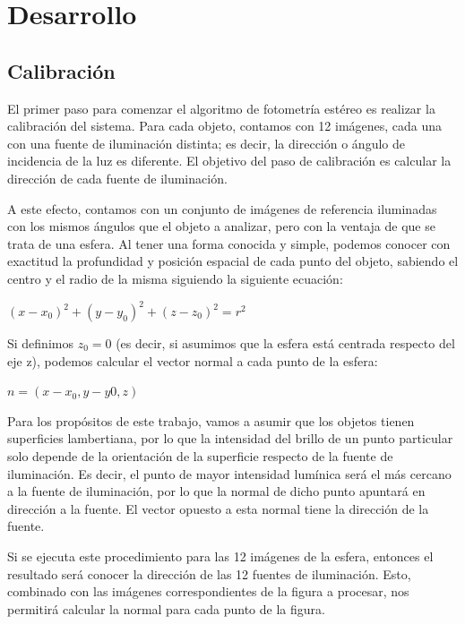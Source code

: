 \section{Desarrollo}

\subsection{Calibración}

El primer paso para comenzar el algoritmo de fotometría estéreo es realizar
la calibración del sistema. Para cada objeto, contamos con 12 imágenes,
cada una con una fuente de iluminación distinta; es decir, la dirección o
ángulo de incidencia de la luz es diferente. El objetivo del paso de calibración
es calcular la dirección de cada fuente de iluminación.

A este efecto, contamos con un conjunto de imágenes de referencia iluminadas
con los mismos ángulos que el objeto a analizar, pero con la ventaja de que se
trata de una esfera. Al tener una forma conocida y simple, podemos conocer con
exactitud la profundidad y posición espacial de cada punto del objeto,
sabiendo el centro y el radio de la misma siguiendo la siguiente ecuación:

\begin{center}
$(x - x_0)^2 + (y - y_0)^2 + (z - z_0)^2 = r^2$
\end{center}

Si definimos $z_0 = 0$ (es decir, si asumimos que la esfera está centrada
respecto del eje z), podemos calcular el vector normal a cada punto de la esfera:

\begin{center}
$n = (x - x_0, y - y0, z)$
\end{center}

Para los propósitos de este trabajo, vamos a asumir que los objetos tienen
superficies lambertiana, por lo que la intensidad del brillo de un punto
particular solo depende de la orientación de la superficie respecto de la
fuente de iluminación. Es decir, el punto de mayor intensidad lumínica
será el más cercano a la fuente de iluminación, por lo que la normal
de dicho punto apuntará en dirección a la fuente. El vector opuesto a esta
normal tiene la dirección de la fuente.

Si se ejecuta este procedimiento para las 12 imágenes de la esfera, entonces
el resultado será conocer la dirección de las 12 fuentes de iluminación. Esto,
combinado con las imágenes correspondientes de la figura a procesar,
nos permitirá calcular la normal para cada punto de la figura.


